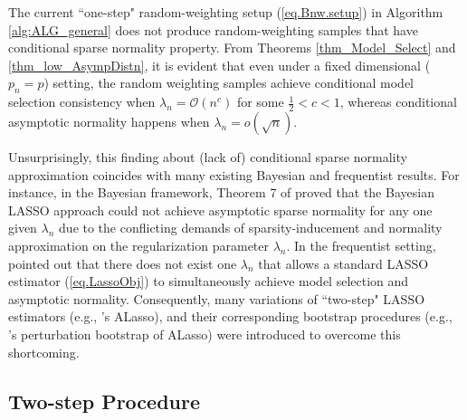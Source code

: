 \documentclass[ejs,authoryear,linksfromyear]{imsart}
\numberwithin{equation}{section}
\theoremstyle{plain}
\begin{document}
The current ``one-step" random-weighting setup (\ref{eq.Bnw.setup}) in Algorithm \ref{alg:ALG_general} does not produce random-weighting samples that have conditional sparse normality property. From Theorems \ref{thm_Model_Select} and \ref{thm_low_AsympDistn}, it is evident that even under a fixed dimensional ($p_n = p$) setting, the random weighting samples achieve conditional model selection consistency when $\lambda_n = \mathcal{O} \left( n^{c} \right)$ for some $\frac{1}{2} < c < 1$, whereas conditional asymptotic normality happens when  $\lambda_n = o \left( \sqrt{n} \right)$. 

Unsurprisingly, this finding about (lack of) conditional sparse normality approximation coincides with many existing Bayesian and frequentist results. For instance, in the Bayesian framework, Theorem 7 of \citet{Castillo2015} proved that the Bayesian LASSO approach \citep{BayesianLasso} could not achieve asymptotic sparse normality for any one given $\lambda_n$ due to the conflicting demands of sparsity-inducement and normality approximation on the regularization parameter $\lambda_n$. In the frequentist setting, \citet{Liu&Yu} pointed out that there does not exist one $\lambda_n$ that allows a standard LASSO estimator (\ref{eq.LassoObj}) to simultaneously achieve model selection and asymptotic normality. Consequently, many variations of ``two-step" LASSO estimators (e.g., \citet{Zou2006}'s ALasso), and their corresponding bootstrap procedures (e.g., \citet{DasGreg2019}'s perturbation bootstrap of ALasso) were introduced to overcome this shortcoming. 

\subsection{Two-step Procedure} \label{sec:MainResults2}
\end{document}
